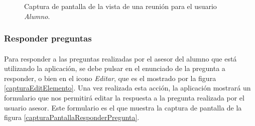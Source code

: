   \begin{figure}[!ht]
    \begin{center}
      \caption{Captura de pantalla de la vista de una reunión para el usuario \textit{Alumno}.}
      \label{capturaPantallaVerReunion}
    \end{center}
  \end{figure}

  \subsubsection{Responder preguntas}\label{responderPreguntas}

  \paragraph{}Para responder a las preguntas realizadas por el asesor del alumno
  que está utilizando la aplicación, se debe pulsar en el enunciado de la
  pregunta a responder, o bien en el icono \textit{Editar}, que es el mostrado
  por la figura \ref{capturaEditElemento}. Una vez realizada esta acción, la
  aplicación mostrará un formulario que nos permitirá editar la respuesta a la
  pregunta realizada por el usuario asesor. Este formulario es el que muestra
  la captura de pantalla de la figura \ref{capturaPantallaResponderPregunta}.


